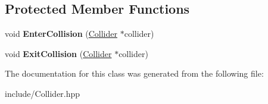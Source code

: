 \subsection*{Protected Member Functions}
\begin{DoxyCompactItemize}
\item 
\hypertarget{class_collider_a2cbf3b4ff9c9a065b5695dc83f4af94c}{void {\bfseries Enter\-Collision} (\hyperlink{class_collider}{Collider} $\ast$collider)}\label{class_collider_a2cbf3b4ff9c9a065b5695dc83f4af94c}

\item 
\hypertarget{class_collider_a065e1542ed037415ea4b0b37d178762f}{void {\bfseries Exit\-Collision} (\hyperlink{class_collider}{Collider} $\ast$collider)}\label{class_collider_a065e1542ed037415ea4b0b37d178762f}

\end{DoxyCompactItemize}


The documentation for this class was generated from the following file\-:\begin{DoxyCompactItemize}
\item 
include/Collider.\-hpp\end{DoxyCompactItemize}

